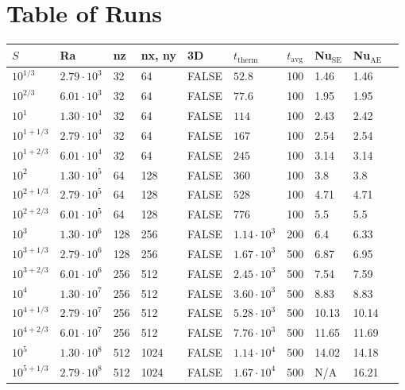 \documentclass[aps, pre, onecolumn, nofootinbib, notitlepage, groupedaddress, amsfonts, amssymb, amsmath, longbibliography]{revtex4-1}
\begin{document}
\section{Table of Runs}
\label{appendix:run_table}
\begin{center}
\begin{tabularx}{\textwidth}{ X X X X X X X X X X }
\hline																	
$S$	&	Ra	&	nz	&	nx, ny	&	3D	&	$t_{\text{therm}}$	&	$t_{\text{avg}}$	&	Nu$_{\text{SE}}$	&	Nu$_{\text{AE}}$	\\
\hline																	
$10^{1/3}$	&	$2.79 \cdot 10^3$	&	32	&	64	&	FALSE	&	$52.8$	&	100	&	1.46	&	1.46	\\
$10^{2/3}$	&	$6.01 \cdot 10^3$	&	32	&	64	&	FALSE	&	$77.6$	&	100	&	1.95	&	1.95	\\
$10^1$	&	$1.30 \cdot 10^4$	&	32	&	64	&	FALSE	&	$114$	&	100	&	2.43	&	2.42	\\
$10^{1 + 1/3}$	&	$2.79 \cdot 10^4$	&	32	&	64	&	FALSE	&	$167$	&	100	&	2.54	&	2.54	\\
$10^{1 + 2/3}$	&	$6.01 \cdot 10^4$	&	32	&	64	&	FALSE	&	$245$	&	100	&	3.14	&	3.14	\\
$10^2$	&	$1.30 \cdot 10^5$	&	64	&	128	&	FALSE	&	$360$	&	100	&	3.8	&	3.8	\\
$10^{2 + 1/3}$	&	$2.79 \cdot 10^5$	&	64	&	128	&	FALSE	&	$528$	&	100	&	4.71	&	4.71	\\
$10^{2 + 2/3}$	&	$6.01 \cdot 10^5$	&	64	&	128	&	FALSE	&	$776$	&	100	&	5.5	&	5.5	\\
$10^3$	&	$1.30 \cdot 10^6$	&	128	&	256	&	FALSE	&	$1.14 \cdot 10^3$	&	200	&	6.4	&	6.33	\\
$10^{3 + 1/3}$	&	$2.79 \cdot 10^6$	&	128	&	256	&	FALSE	&	$1.67 \cdot 10^3$	&	500	&	6.87	&	6.95	\\
$10^{3 + 2/3}$	&	$6.01 \cdot 10^6$	&	256	&	512	&	FALSE	&	$2.45 \cdot 10^3$	&	500	&	7.54	&	7.59	\\
$10^4$	&	$1.30 \cdot 10^7$	&	256	&	512	&	FALSE	&	$3.60 \cdot 10^3$	&	500	&	8.83	&	8.83	\\
$10^{4 + 1/3}$	&	$2.79 \cdot 10^7$	&	256	&	512	&	FALSE	&	$5.28 \cdot 10^3$	&	500	&	10.13	&	10.14	\\
$10^{4 + 2/3}$	&	$6.01 \cdot 10^7$	&	256	&	512	&	FALSE	&	$7.76 \cdot 10^3$	&	500	&	11.65	&	11.69	\\
$10^5$	&	$1.30 \cdot 10^8$	&	512	&	1024	&	FALSE	&	$1.14 \cdot 10^4$	&	500	&	14.02	&	14.18	\\
$10^{5 + 1/3}$	&	$2.79 \cdot 10^8$	&	512	&	1024	&	FALSE	&	$1.67 \cdot 10^4$	&	500	&	N/A	&	16.21	\\

\end{tabularx}
\end{center}
\end{document}
